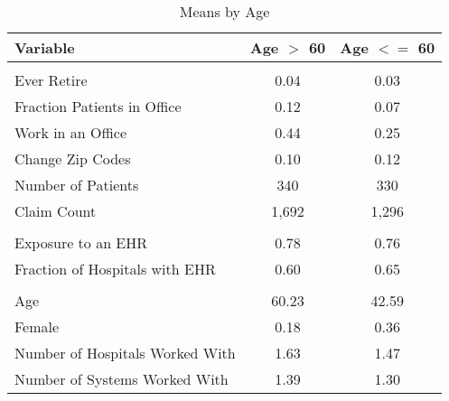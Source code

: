  \renewcommand{\thetable}{2}
\begin{table}[ht]

\caption{Means by Age \label{tab:splitstats}}
\centering
\begin{tabular}[t]{lcc}
\toprule
Variable & Age $>$ 60 & Age $<=$ 60\\
\midrule
\addlinespace[0.3em]
\multicolumn{3}{l}{\textbf{Outcomes}}\\
\hspace{1em}Ever Retire & 0.04 & 0.03\\
\hspace{1em}Fraction Patients in Office & 0.12 & 0.07\\
\hspace{1em}Work in an Office & 0.44 & 0.25\\
\hspace{1em}Change Zip Codes & 0.10 & 0.12\\
\hspace{1em}Number of Patients & 340 & 330\\
\hspace{1em}Claim Count & 1,692 & 1,296\\
\addlinespace[0.3em]
\multicolumn{3}{l}{\textbf{Treatment}}\\
\hspace{1em}Exposure to an EHR & 0.78 & 0.76\\
\hspace{1em}Fraction of Hospitals with EHR & 0.60 & 0.65\\
\addlinespace[0.3em]
\multicolumn{3}{l}{\textbf{Characteristics}}\\
\hspace{1em}Age & 60.23 & 42.59\\
\hspace{1em}Female & 0.18 & 0.36\\
\hspace{1em}Number of Hospitals Worked With & 1.63 & 1.47\\
\hspace{1em}Number of Systems Worked With & 1.39 & 1.30\\
\bottomrule
\end{tabular}
\end{table}
